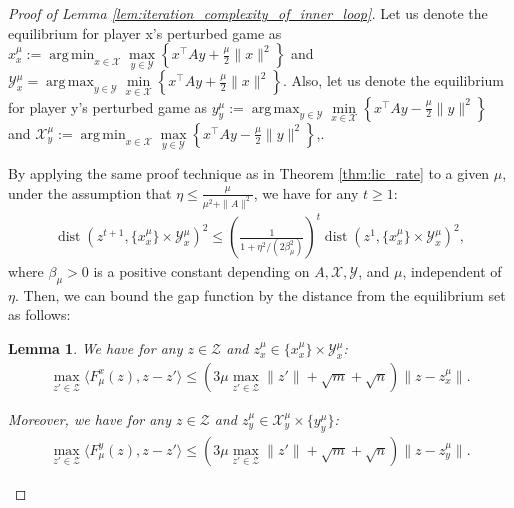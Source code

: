 \documentclass{article}
\DeclareMathOperator*{\argmax}{arg\,max}
\DeclareMathOperator*{\argmin}{arg\,min}
\DeclareMathOperator{\dist}{dist}
\newcommand{\X}{\mathcal{X}}
\newcommand{\Y}{\mathcal{Y}}
\newcommand{\Z}{\mathcal{Z}}
\theoremstyle{plain}
\newtheorem{lemma}[theorem]{Lemma}
\begin{document}
\begin{proof}[Proof of Lemma \ref{lem:iteration_complexity_of_inner_loop}]
    Let us denote the equilibrium for player x's perturbed game as $x_x^{\mu} := \argmin_{x\in \X}\max\limits_{y\in \Y}\left\{ x^{\top}Ay + \frac{\mu}{2}\|x\|^2\right\}$ and $\Y_x^{\mu} = \argmax_{y\in \Y}\min\limits_{x\in \X}\left\{ x^{\top}Ay + \frac{\mu}{2}\|x\|^2\right\}$.
    Also, let us denote the equilibrium for player y's perturbed game as $y_y^{\mu} := \argmax_{y\in \Y}\min\limits_{x\in \X}\left\{ x^{\top}Ay - \frac{\mu}{2}\|y\|^2\right\}$ and $\X_y^{\mu} := \argmin_{x\in \X}\max\limits_{y\in \Y}\left\{ x^{\top}Ay - \frac{\mu}{2}\|y\|^2\right\}$,.

    By applying the same proof technique as in Theorem \ref{thm:lic_rate} to a given $\mu$, under the assumption that $\eta \leq \frac{\mu}{\mu^2 + \|A\|^2}$, we have for any $t\geq 1$:
    \begin{align}
        \dist\!\left(z^{t+1}, \{x_x^{\mu}\}\times \Y_x^{\mu}\right)^2 \leq \left(\frac{1}{1 + \eta^2 / (2\beta_{\mu}^2)}\right)^t \dist\!\left(z^1, \{x_x^{\mu}\}\times \Y_x^{\mu}\right)^2,
        \label{eq:lic_rate_in_inner_loop}
    \end{align}
    where $\beta_{\mu} > 0$ is a positive constant depending on $A, \X, \Y$, and $\mu$, independent of $\eta$.
    Then, we can bound the gap function by the distance from the equilibrium set as follows:
    \begin{lemma}
        We have for any $z\in \Z$ and $z_x^{\mu}\in \{x_x^{\mu}\} \times \Y_x^{\mu}$:
        \begin{align*}
            \max_{z'\in \Z}\langle F_{\mu}^x(z), z - z'\rangle \leq \left(3\mu\max_{z'\in \Z}\|z'\| + \sqrt{m} + \sqrt{n}\right) \|z - z_x^{\mu}\|.
        \end{align*}

        Moreover, we have for any $z\in \Z$ and $z_y^{\mu}\in \X_y^{\mu} \times \{y_y^{\mu}\}$:
        \begin{align*}
            \max_{z'\in \Z}\langle F_{\mu}^y(z), z - z'\rangle \leq \left(3\mu\max_{z'\in \Z}\|z'\| + \sqrt{m} + \sqrt{n}\right) \|z - z_y^{\mu}\|.
        \end{align*}
        \label{lem:upper_bound_on_the_perturbed_gap}
    \end{lemma}


\end{proof}
\end{document}
